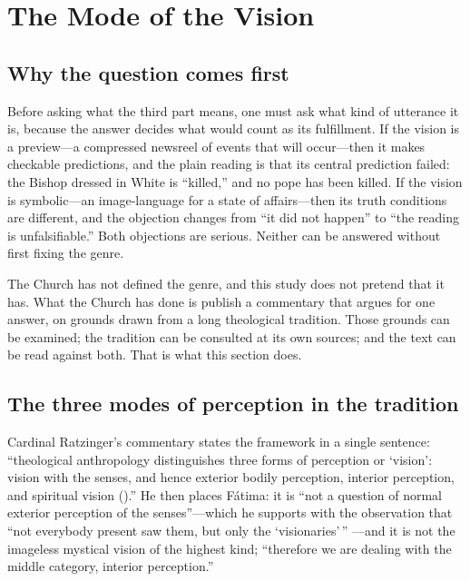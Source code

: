 \section{The Mode of the Vision}\label{sec:mode}

\subsection{Why the question comes first}

Before asking what the third part means, one must ask what kind of
utterance it is, because the answer decides what would count as its
fulfillment. If the vision is a preview---a compressed newsreel of
events that will occur---then it makes checkable predictions, and the
plain reading is that its central prediction failed: the Bishop
dressed in White is ``killed,'' and no pope has been killed. If the
vision is symbolic---an image-language for a state of affairs---then
its truth conditions are different, and the objection changes from
``it did not happen'' to ``the reading is unfalsifiable.'' Both
objections are serious. Neither can be answered without first fixing
the genre.

The Church has not defined the genre, and this study does not pretend
that it has. What the Church has done is publish a commentary that
argues for one answer, on grounds drawn from a long theological
tradition. Those grounds can be examined; the tradition can be
consulted at its own sources; and the text can be read against both.
That is what this section does.

\subsection{The three modes of perception in the tradition}

Cardinal Ratzinger's commentary states the framework in a single
sentence: ``theological anthropology distinguishes three forms of
perception or `vision': vision with the senses, and hence exterior
bodily perception, interior perception, and spiritual vision
().'' He
then places F\'atima: it is ``not a question of normal exterior
perception of the senses''---which he supports with the observation
that ``not everybody present saw them, but only the `visionaries'\,''
---and it is not the imageless mystical vision of the highest kind;
``therefore we are dealing with the middle category, interior
perception.''

